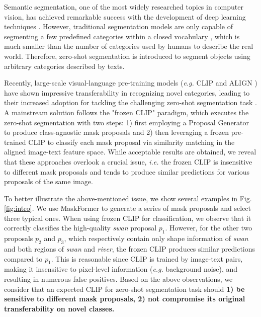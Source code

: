 Semantic segmentation, one of the most widely researched topics in computer vision, has achieved remarkable success \cite{chen2017deeplab,pspnet,huang2019ccnet,huang2021alignseg} with the development of deep learning techniques \cite{resnet}. However, traditional segmentation models are only capable of segmenting a few predefined categories within a closed vocabulary \cite{pascal, coco, miao2021vspw, miao2022large}, which is much smaller than the number of categories used by humans to describe the real world. Therefore, zero-shot segmentation \cite{spnet, zs5, cagnet, han2023global} is introduced to segment objects using arbitrary categories described by texts.

Recently, large-scale visual-language pre-training models (\textit{e.g.} CLIP \cite{radford2021learning} and ALIGN \cite{jia2021scaling}) have shown impressive transferability in recognizing novel categories, leading to their increased adoption for tackling the challenging zero-shot segmentation task \cite{zegformer,zsseg,ovseg,freeseg}. A mainstream solution follows the "frozen CLIP" paradigm, which executes the zero-shot segmentation with two steps: 1) first employing a Proposal Generator to produce class-agnostic mask proposals and 2) then leveraging a frozen pre-trained CLIP to classify each mask proposal via similarity matching in the aligned image-text feature space. While acceptable results are obtained, we reveal that these approaches overlook a crucial issue, \textit{i.e.} the frozen CLIP is insensitive to different mask proposals and tends to produce similar predictions for various proposals of the same image. 

To better illustrate the above-mentioned issue, we show several examples in Fig. \ref{fig:intro}. We use MaskFormer \cite{cheng2021maskformer} to generate a series of mask proposals and select three typical ones. When using frozen CLIP for classification, we observe that it correctly classifies the high-quality \textit{swan} proposal $p_1$. However, for the other two proposals $p_2$ and $p_3$, which respectively contain only shape information of \textit{swan} and both regions of \textit{swan} and \textit{river}, the frozen CLIP produces similar predictions compared to $p_1$. 
This is reasonable since CLIP is trained by image-text pairs, making it insensitive to pixel-level information (\textit{e.g.} background noise), and resulting in numerous false positives.
Based on the above observations, we consider that an expected CLIP for zero-shot segmentation task should \textbf{1) be sensitive to different mask proposals, 2) not compromise its original transferability on novel classes.}
 
